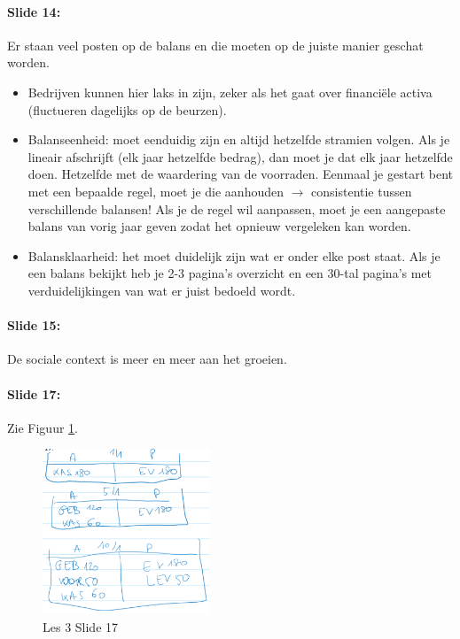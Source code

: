 \documentclass[10pt,a4paper]{report}
\begin{document}
\paragraph{Slide 14:} Er staan veel posten op de balans en die moeten op de juiste manier geschat worden.
\begin{itemize} 
\item Bedrijven kunnen hier laks in zijn, zeker als het gaat over financi\"ele activa (fluctueren dagelijks op de beurzen). 
\item Balanseenheid: moet eenduidig zijn en altijd hetzelfde stramien volgen. Als je lineair afschrijft (elk jaar hetzelfde bedrag), dan moet je dat elk jaar hetzelfde doen. Hetzelfde met de waardering van de voorraden. Eenmaal je gestart bent met een bepaalde regel, moet je die aanhouden $\rightarrow$ consistentie tussen verschillende balansen! Als je de regel wil aanpassen, moet je een aangepaste balans van vorig jaar geven zodat het opnieuw vergeleken kan worden.
\item Balansklaarheid: het moet duidelijk zijn wat er onder elke post staat. Als je een balans bekijkt heb je 2-3 pagina's overzicht en een 30-tal pagina's met verduidelijkingen van wat er juist bedoeld wordt.
\end{itemize}

\paragraph{Slide 15:} De sociale context is meer en meer aan het groeien.

\paragraph{Slide 17:} Zie Figuur \ref{les03_03}.

\begin{figure}[h!]
\centering
\includegraphics[width=50mm]{Les03_03.png}
\caption{Les 3 Slide 17} 
\label{les03_03}
\end{figure}
\end{document}
